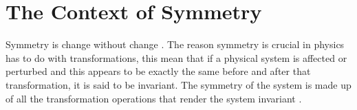 \section{The Context of Symmetry}
\label{sec:chapter-2-from-symmetry}
\vspace{-10mm}
Symmetry is change without change \cite{powell2010symmetry,tapp2021symmetry}. The reason symmetry is crucial in physics has to do with transformations, this mean that if a physical system is affected or perturbed  and this appears to be exactly the same before and after that transformation, it is said to be invariant. The symmetry of the system is made up of all the transformation operations that render the system invariant \cite{powell2010symmetry}.



